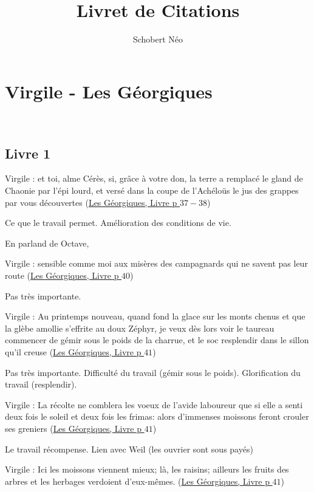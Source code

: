 \documentclass[a4paper, 11pt, hidelinks]{article}
\newcommand{\bs}{\bigskip}
\newcommand{\rb}[1]{\Romanbar{#1}}
\newcommand{\citer}[3]{\bs \begin{center} \textcolor{authorGray}{#1 :} \textcolor{citationRed}{\og #2 \fg} \textcolor{authorGray}{(\underline{#3})} \end{center} \bs}
\begin{document}
\newcommand{\grad}[1]{\vv{grad}#1}


\title{Livret de Citations}
\author{Schobert Néo}

\maketitle

\tableofcontents



\newpage


\section{Virgile - Les Géorgiques} 


\subsection{Livre 1}

\citer{Virgile}{et toi, alme Cérès, si, grâce à votre don, la terre a remplacé le gland de Chaonie par l'épi lourd, 
et versé dans la coupe de l'Achéloüs le jus des grappes par vous découvertes}{Les Géorgiques, Livre \rb{1} p $37-38$}


Ce que le travail permet. Amélioration des conditions de vie.


En parland de Octave, \citer{Virgile}{sensible comme moi aux misères des campagnards qui ne savent pas leur 
route}{Les Géorgiques, Livre \rb{1} p $40$}


Pas très importante.


\citer{Virgile}{Au printemps nouveau, quand fond la glace sur les monts chenus et que la glèbe amollie s'effrite
au doux Zéphyr, je veux dès lors voir le taureau commencer de gémir sous le poids de la charrue, et le soc
resplendir dans le sillon qu'il creuse}{Les Géorgiques, Livre \rb{1} p $41$}


Pas très importante. Difficulté du travail (gémir sous le poids). Glorification du travail (resplendir).


\citer{Virgile}{La récolte ne comblera les voeux de l'avide laboureur que si elle a senti deux fois le soleil et deux 
fois les frimas: alors d'immenses moissons feront crouler ses greniers}{Les Géorgiques, Livre \rb{1} p $41$}


Le travail récompense. Lien avec Weil (les ouvrier sont sous payés)


\citer{Virgile}{Ici les moissons viennent mieux; là, les raisins; ailleurs les fruits des arbres et les herbages verdoient d'eux-mêmes.}{Les Géorgiques, Livre \rb{1} p $41$}
\end{document}
